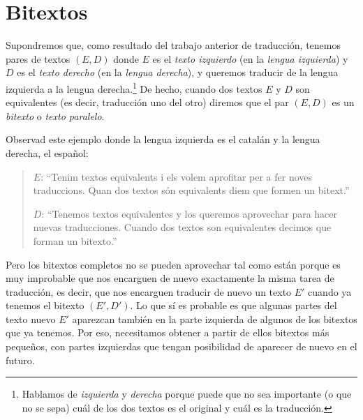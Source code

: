 \section{Bitextos} \label{ss:bitextos} 

Supondremos que, como resultado del trabajo anterior de traducción, tenemos pares de textos $(E,D)$ donde $E$ es el \emph{texto izquierdo} (en la \emph{lengua izquierda}) y $D$ es el \emph{texto derecho} (en la \emph{lengua derecha}), y queremos traducir de la lengua izquierda a la lengua derecha.\footnote{Hablamos de \emph{izquierda} y \emph{derecha} porque puede que no sea importante (o que no se sepa) cuál de los dos textos es el original y cuál es la traducción.} De hecho, cuando dos textos $E$ y $D$ son equivalentes (es decir, traducción uno del otro) diremos que el par $(E,D)$ es un \emph{bitexto} o \emph{texto paralelo}. 

Observad este ejemplo donde la lengua izquierda es el catalán y la lengua derecha, el español: \begin{quote} $E$: ``Tenim textos equivalents i els volem aprofitar per a fer noves traduccions. Quan dos textos són equivalents diem que formen un bitext.'' 

$D$: ``Tenemos textos equivalentes y los queremos aprovechar para hacer nuevas traducciones. Cuando dos textos son equivalentes decimos que forman un bitexto.'' \end{quote} 

Pero los bitextos completos no se pueden aprovechar tal como están porque es muy improbable que nos encarguen de nuevo exactamente la misma tarea de traducción, es decir, que nos encarguen traducir de nuevo un texto $E'$ cuando ya tenemos el bitexto $(E',D')$. Lo que sí es probable es que algunas partes del texto nuevo $E'$ aparezcan también en la parte izquierda de algunos de los bitextos que ya tenemos. Por eso, necesitamos obtener a partir de ellos bitextos más pequeños, con partes izquierdas que tengan posibilidad de aparecer de nuevo en el futuro. 

